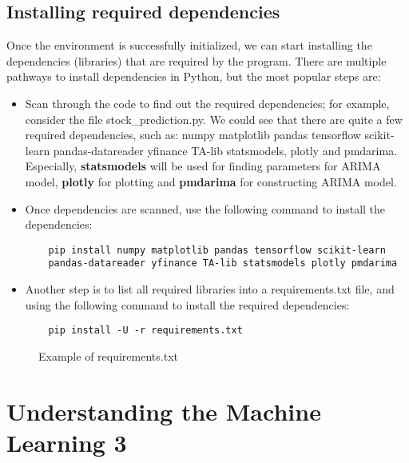 \documentclass[11pt]{article}
\begin{document}
\subsection{Installing required dependencies}
Once the environment is successfully initialized, we can start installing the dependencies (libraries) that are required by the program. There are multiple pathways to install dependencies in Python, but the most popular steps are:

\begin{itemize}
    \item Scan through the code to find out the required dependencies; for example, consider the file stock\_prediction.py. We could see that there are quite a few required dependencies, such as: numpy matplotlib pandas tensorflow scikit-learn pandas-datareader yfinance TA-lib statsmodels, plotly and pmdarima. Especially, \textbf{statsmodels} will be used for finding parameters for ARIMA model, \textbf{plotly} for plotting and \textbf{pmdarima} for constructing ARIMA model.
    \item Once dependencies are scanned, use the following command to install the dependencies:
    \begin{center}
    \begin{verbatim}
    pip install numpy matplotlib pandas tensorflow scikit-learn
    pandas-datareader yfinance TA-lib statsmodels plotly pmdarima
    \end{verbatim}
    \end{center}
    \item Another step is to list all required libraries into a requirements.txt file, and using the following command to install the required dependencies:
    \begin{center}
    \begin{verbatim}
    pip install -U -r requirements.txt
    \end{verbatim}
    \end{center}
\end{itemize}

\begin{figure}[ht]
    \centering
    \caption{Example of requirements.txt}
    \label{fig:requirements}
\end{figure}

\section{Understanding the Machine Learning 3}
\end{document}
